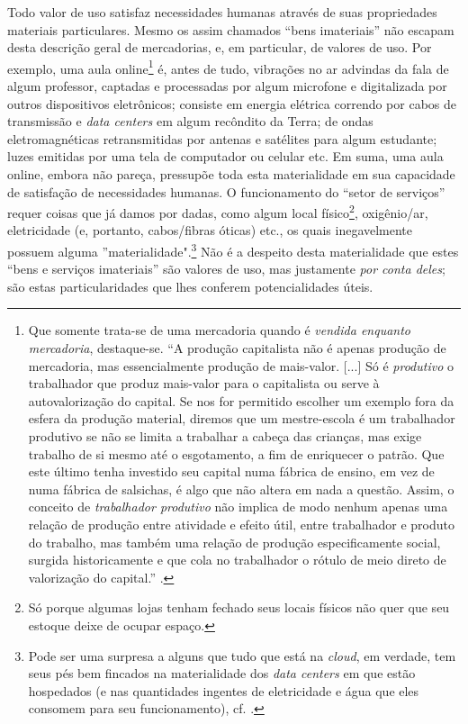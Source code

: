 \documentclass[12pt]{article}
\begin{document}
Todo valor de uso satisfaz necessidades humanas através de suas propriedades materiais particulares. Mesmo os assim chamados ``bens imateriais'' não escapam desta descrição geral de mercadorias, e, em particular, de valores de uso. Por exemplo, uma aula online\footnote{Que somente trata-se de uma mercadoria quando é \textit{vendida enquanto mercadoria}, destaque-se. ``A produção capitalista não é apenas produção de mercadoria, mas essencialmente produção de mais-valor. [...] Só é \textit{produtivo} o trabalhador que produz mais-valor para o capitalista ou serve à autovalorização do capital. Se nos for permitido escolher um exemplo fora da esfera da produção material, diremos que um mestre-escola é um trabalhador produtivo se não se limita a trabalhar a cabeça das crianças, mas exige trabalho de si mesmo até o esgotamento, a fim de enriquecer o patrão. Que este último tenha investido seu capital numa fábrica de ensino, em vez de numa fábrica de salsichas, é algo que não altera em nada a questão. Assim, o conceito de \textit{trabalhador produtivo} não implica de modo nenhum apenas uma relação de produção entre atividade e efeito útil, entre trabalhador e produto do trabalho, mas também uma relação de produção especificamente social, surgida historicamente e que cola no trabalhador o rótulo de meio direto de valorização do capital.'' \parencite[p. 578, grifo meu]{Marx2017}.} é, antes de tudo, vibrações no ar advindas da fala de algum professor, captadas e processadas por algum microfone e digitalizada por outros dispositivos eletrônicos; consiste em energia elétrica correndo por cabos de transmissão e \textit{data centers} em algum recôndito da Terra; de ondas eletromagnéticas retransmitidas por antenas e satélites para algum estudante; luzes emitidas por uma tela de computador ou celular etc. Em suma, uma aula online, embora não pareça, pressupõe toda esta materialidade em sua capacidade de satisfação de necessidades humanas. O funcionamento do ``setor de serviços'' requer coisas que já damos por dadas, como algum local físico\footnote{Só porque algumas lojas tenham fechado seus locais físicos não quer que seu estoque deixe de ocupar espaço.}, oxigênio/ar, eletricidade (e, portanto, cabos/fibras óticas) etc., os quais inegavelmente possuem alguma ''materialidade".\footnote{Pode ser uma surpresa a alguns que tudo que está na \textit{cloud}, em verdade, tem seus pés bem fincados na materialidade dos \textit{data centers} em que estão hospedados (e nas quantidades ingentes de eletricidade e água que eles consomem para seu funcionamento), cf. \textcite{Monserrate2022}.} Não é a despeito desta materialidade que estes ``bens e serviços imateriais'' são valores de uso, mas justamente \textit{por conta deles}; são estas particularidades que lhes conferem potencialidades úteis. 
\end{document}
